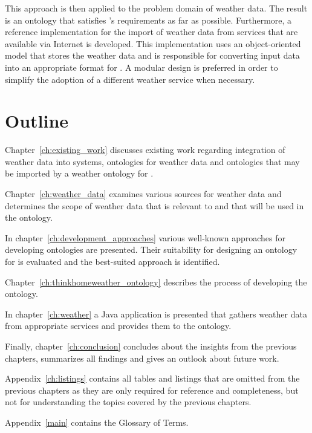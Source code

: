 This approach is then applied to the problem domain of weather data. The result is an ontology that satisfies \thinkhome's requirements as far as possible. Furthermore, a reference implementation for the import of weather data from services that are available via Internet is developed. This implementation uses an object-oriented model that stores the weather data and is responsible for converting input data into an appropriate format for \thinkhome. A modular design is preferred in order to simplify the adoption of a different weather service when necessary.



\section{Outline}

Chapter~\ref{ch:existing_work} discusses existing work regarding integration of weather data into \smarthome systems, ontologies for weather data and ontologies that may be imported by a weather ontology for \thinkhome.

Chapter~\ref{ch:weather_data} examines various sources for weather data and determines the scope of weather data that is relevant to \thinkhome and that will be used in the ontology.

In chapter~\ref{ch:development_approaches} various well-known approaches for developing ontologies are presented. Their suitability for designing an ontology for \thinkhome is evaluated and the best-suited approach is identified.

Chapter~\ref{ch:thinkhomeweather_ontology} describes the process of developing the ontology.

In chapter~\ref{ch:weather} a Java application is presented that gathers weather data from appropriate services and provides them to the \thinkhome ontology.

Finally, chapter~\ref{ch:conclusion} concludes about the insights from the previous chapters, summarizes all findings and gives an outlook about future work.

Appendix~\ref{ch:listings} contains all tables and listings that are omitted from the previous chapters as they are only required for reference and completeness, but not for understanding the topics covered by the previous chapters.

Appendix~\ref{main} contains the Glossary of Terms.

